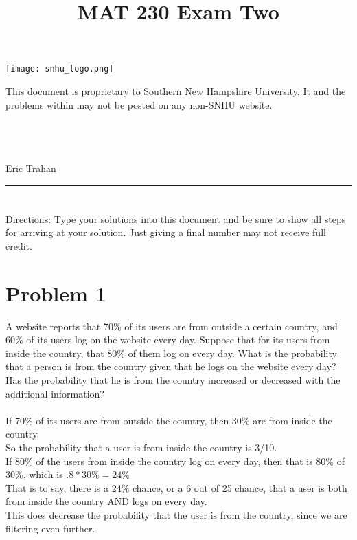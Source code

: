 \documentclass{amsart}
\theoremstyle{definition}
\theoremstyle{Exercise}
\theoremstyle{remark}
\theoremstyle{rule}
\numberwithin{equation}{section}
\begin{document}
\title{\sf MAT 230 Exam Two}%





\begin{center}
\texttt{[image: snhu\_logo.png]}
\end{center}

\maketitle
This document is proprietary to Southern New Hampshire University. It and the problems within may not be posted on any non-SNHU website.\\\\\\\\
\begin{center}
Eric Trahan
\end{center}

\begin{center}
\rule{\textwidth}{0.4pt}
\end{center}
\newpage
\section*{}
\section*{}
Directions: Type your solutions into this document and be sure to show all steps for arriving at your solution. Just giving a final number may not receive full credit.
\\
\section*{Problem 1}

A website reports that 70\% of its users are from outside a certain country, and 60\% of its users log on the website every day. Suppose that for its users from inside the country, that 80\% of them log on every day. What is the probability that a person is from the country given that he logs on the website every day? Has the probability that he is from the country increased or decreased with the additional information?
\\\\
  If 70\% of its users are from outside the country, then 30\% are from inside the country.\\
  So the probability that a user is from inside the country is 3/10.\\
  If 80\% of the users from inside the country log on every day, then that is 80\% of 30\%, which is $.8 * 30\% = 24\%$\\
  That is to say, there is a 24\% chance, or a 6 out of 25 chance, that a user is both from inside the country AND logs on every day.\\
  This does decrease the probability that the user is from the country, since we are filtering even further.
\\\\
\newpage
\end{document}
